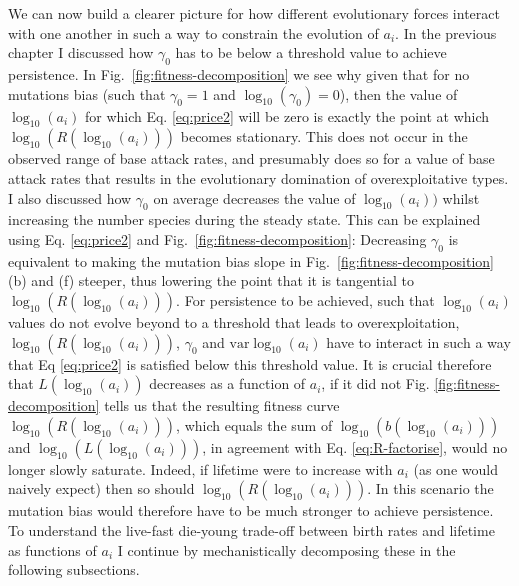 \documentclass[a4paper]{report}
\DeclareMathOperator{\log}{log}
\begin{document}
We can now build a clearer picture for how different evolutionary forces interact with one another in such a way to constrain the evolution of $a_i$. In the previous chapter I discussed how $\gamma_0$ has to be below a threshold value to achieve persistence. In Fig.~\ref{fig:fitness-decomposition} we see why given that for no mutations bias (such that $\gamma_0=1$ and $\log_{10}(\gamma_0)=0$), then the value of $\log_{10}(a_i)$ for which Eq. \eqref{eq:price2} will be zero is exactly the point at which $\log_{10}(R(\log_{10}(a_i)))$ becomes stationary. This does not occur in the observed range of base attack rates, and presumably does so for a value of base attack rates that results in the evolutionary domination of overexploitative types. I also discussed how $\gamma_0$ on average decreases the value of $\log_{10}(a_i))$ whilst increasing the number species during the steady state. This can be explained using Eq. \eqref{eq:price2} and Fig.~\ref{fig:fitness-decomposition}: Decreasing $\gamma_0$ is equivalent to making the mutation bias slope in Fig.~\ref{fig:fitness-decomposition} (b) and (f) steeper, thus lowering the point that it is tangential to $\log_{10}(R(\log_{10}(a_i)))$. For persistence to be achieved, such that $\log_{10}(a_i)$ values do not evolve beyond to a threshold that leads to overexploitation, $\log_{10}(R(\log_{10}(a_i)))$, $\gamma_0$ and $\text{var}\log_{10}(a_i)$ have to interact in such a way that Eq \eqref{eq:price2} is satisfied below this threshold value. It is crucial therefore that $L(\log_{10}(a_i))$ decreases as a function of $a_i$, if it did not Fig. \ref{fig:fitness-decomposition} tells us that  the resulting fitness curve $\log_{10}(R(\log_{10}(a_i)))$, which equals the sum of $\log_{10}(b(\log_{10}(a_i)))$ and $\log_{10}(L(\log_{10}(a_i)))$, in agreement with Eq. \eqref{eq:R-factorise}, would no longer slowly saturate. Indeed, if lifetime were to increase with $a_i$ (as one would naively expect) then so should $\log_{10}(R(\log_{10}(a_i)))$. In this scenario the mutation bias would therefore have to be much stronger to achieve persistence. To understand the live-fast die-young trade-off between birth rates and lifetime as functions of $a_i$ I continue by mechanistically decomposing these in the following subsections. \\
\end{document}
